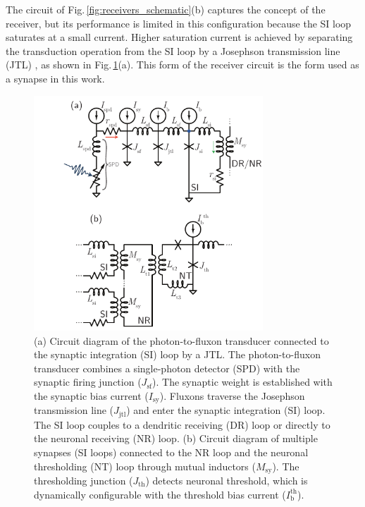 \documentclass[twocolumn]{article}
\begin{document}
The circuit of Fig.\,\ref{fig:receivers_schematic}(b) captures the concept of the receiver, but its performance is limited in this configuration because the SI loop saturates at a small current. Higher saturation current is achieved by separating the transduction operation from the SI loop by a Josephson transmission line (JTL) \cite{ka1999,vatu1998}, as shown in Fig.\,\ref{fig:receivers_circuitDiagrams}(a). This form of the receiver circuit is the form used as a synapse in this work. 
\begin{figure}[t!]
	\centerline{\includegraphics[width=8.6cm]{_receivers_circuitDiagrams_small.pdf}}
	\caption{\label{fig:receivers_circuitDiagrams}(a) Circuit diagram of the photon-to-fluxon transducer connected to the synaptic integration (SI) loop by a JTL. The photon-to-fluxon transducer combines a single-photon detector (SPD) with the synaptic firing junction ($J_{\mathrm{sf}}$). The synaptic weight is established with the synaptic bias current ($I_{\mathrm{sy}}$). Fluxons traverse the Josephson transmission line ($J_{\mathrm{jtl}}$) and enter the synaptic integration (SI) loop. The SI loop couples to a dendritic receiving (DR) loop or directly to the neuronal receiving (NR) loop. (b) Circuit diagram of multiple synapses (SI loops) connected to the NR loop and the neuronal thresholding (NT) loop through mutual inductors ($M_{\mathrm{sy}}$). The thresholding junction ($J_{\mathrm{th}}$) detects neuronal threshold, which is dynamically configurable with the threshold bias current ($I_{\mathrm{b}}^{\mathrm{th}}$).}
\end{figure}
\end{document}

